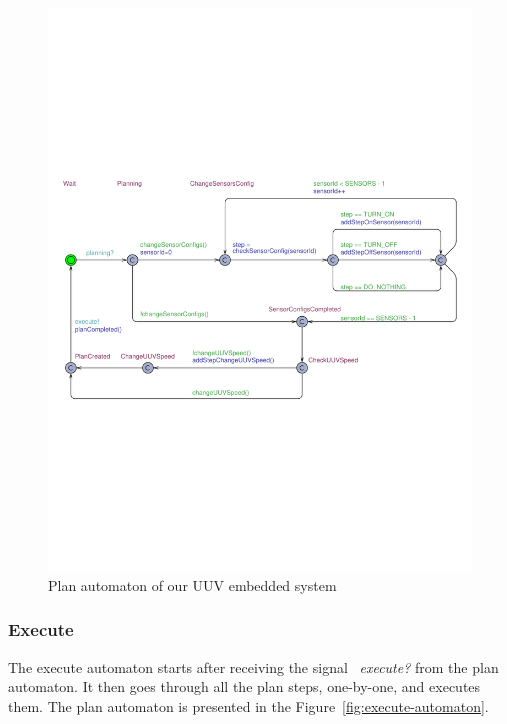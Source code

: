 \begin{figure}[h!]
	\centering
	\includegraphics[trim = 5mm 80mm 0mm 90mm, clip, width=\linewidth]{figures/Planner.pdf}
	\caption{Plan automaton of our UUV embedded system}\label{fig:plan-automaton}
	
	\vspace*{-2mm}
\end{figure}


\subsubsection{Execute}
The execute automaton starts after receiving the signal ~\textit{execute?} from the plan automaton. It then goes through all the plan steps, one-by-one, and executes them. The plan automaton is presented in the Figure~\ref{fig:execute-automaton}.

